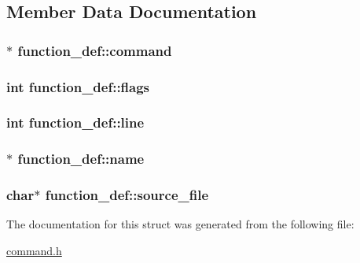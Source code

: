 \subsection{Member Data Documentation}
\subsubsection[{\texorpdfstring{command}{command}}]{$\ast$ function\+\_\+def\+::command}\hypertarget{structfunction__def_a1d47a692dd8fb660368206a3218f3fe8}{}\label{structfunction__def_a1d47a692dd8fb660368206a3218f3fe8}
\subsubsection[{\texorpdfstring{flags}{flags}}]{\setlength{\rightskip}{0pt plus 5cm}int function\+\_\+def\+::flags}\hypertarget{structfunction__def_a6301401481265ca9b5282b683b2ba2d4}{}\label{structfunction__def_a6301401481265ca9b5282b683b2ba2d4}
\subsubsection[{\texorpdfstring{line}{line}}]{\setlength{\rightskip}{0pt plus 5cm}int function\+\_\+def\+::line}\hypertarget{structfunction__def_a522bca5d5ecc615cff04e01de1d19ffc}{}\label{structfunction__def_a522bca5d5ecc615cff04e01de1d19ffc}
\subsubsection[{\texorpdfstring{name}{name}}]{$\ast$ function\+\_\+def\+::name}\hypertarget{structfunction__def_a0015166324aa0e5e336c97afcec63059}{}\label{structfunction__def_a0015166324aa0e5e336c97afcec63059}
\subsubsection[{\texorpdfstring{source\+\_\+file}{source_file}}]{\setlength{\rightskip}{0pt plus 5cm}char$\ast$ function\+\_\+def\+::source\+\_\+file}\hypertarget{structfunction__def_ad21801282b94695a306f3864c2bd7376}{}\label{structfunction__def_ad21801282b94695a306f3864c2bd7376}


The documentation for this struct was generated from the following file\+:\begin{DoxyCompactItemize}
\item 
\hyperlink{command_8h}{command.\+h}\end{DoxyCompactItemize}

